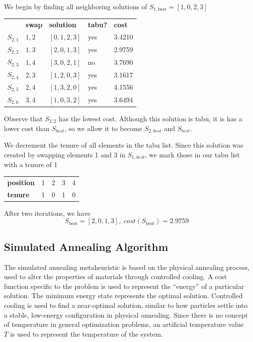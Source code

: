\documentclass[a4paper]{article}
\begin{document}
We begin by finding all neighboring solutions of $S_{1, \text{best}} = [1, 0, 2, 3]$
\begin{center}
\begin{tabular}{lllll}
& \textbf{swap}   & \textbf{solution}    & \textbf{tabu?} & \textbf{cost}  \\
$S_{2,1}$ & $1,2$ & $[0, 1, 2, 3]$ & yes & 3.4210 \\
$S_{2,2}$ & $1,3$ & $[2, 0, 1, 3]$ & yes & 2.9759 \\
$S_{2,3}$ & $1,4$ & $[3, 0, 2, 1]$ & no  & 3.7690 \\
$S_{2,4}$ & $2,3$ & $[1, 2, 0, 3]$ & yes & 3.1617 \\
$S_{2,5}$ & $2,4$ & $[1, 3, 2, 0]$ & yes & 4.1556 \\
$S_{2,6}$ & $3,4$ & $[1, 0, 3, 2]$ & yes & 3.6494 \\
\end{tabular}
\end{center}
\vspace{1.5em}

Observe that $S_{2,2}$ has the lowest cost. Although this solution is tabu, it is has a lower cost than $S_\textit{best}$, so we allow it to become $S_{2, \textit{best}}$ and $S_\textit{best}$.

We decrement the tenure of all elements in the tabu list. Since this solution was created by swapping elements 1 and 3 in $S_{1, \textit{best}}$, we mark those in our tabu list with a tenure of 1

\begin{center}
\begin{tabular}{lllll}
\textbf{position} & 1 & 2 & 3 & 4 \\
\textbf{tenure}   & 1 & 0 & 1 & 0
\end{tabular}
\end{center}
\vspace{1.5em}

After two iterations, we have
$$S_{\text{best}} = [2, 0, 1, 3], \; \textit{cost}(S_{\text{best}}) = 2.9759$$

\subsection{Simulated Annealing Algorithm} %

The simulated annealing metaheuristic is based on the physical annealing process, used to alter the properties of materials through controlled cooling.\cite{Kirkpatrick} A cost function specific to the problem is used to represent the ``energy'' of a particular solution. The minimum energy state represents the optimal solution. Controlled cooling is used to find a near-optimal solution, similar to how particles settle into a stable, low-energy configuration in physical annealing. Since there is no concept of temperature in general optimization problems, an artificial temperature value $T$ is used to represent the temperature of the system.
\end{document}
